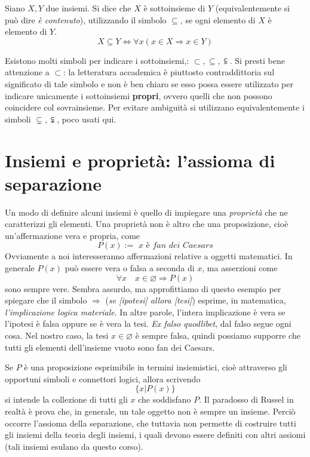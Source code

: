 \documentclass[oneside]{book}
\begin{document}
\begin{tcolorbox}[colback=yellow!30, colframe=yellow!30!black, title={Sottoinsiemi}]
Siano $X,Y$ due insiemi. Si dice che $X$ è sottoinsieme di $Y$
(equivalentemente si può dire \emph{è contenuto}), utilizzando il simbolo $\subseteq$,
se ogni elemento di $X$ è elemento di $Y$.
\[ X \subseteq Y \Longleftrightarrow \forall x(x\in X \Rightarrow x\in Y) \]
\end{tcolorbox}

\begin{osservaz}
Esistono molti simboli per indicare i
sottoinsiemi,: $\subset,\subseteq,\subseteqq$.
Si presti bene attenzione a $\subset$: la letteratura
accademica è piuttosto contraddittoria sul significato di tale
simbolo e non è ben chiaro se esso possa essere utilizzato per
indicare unicamente i sottoinsiemi \textbf{propri}, ovvero quelli
che non possono coincidere col sovrainsieme. Per evitare
ambiguità si utilizzano equivalentemente i simboli $\subsetneq,\subsetneqq$, poco usati
qui.
\end{osservaz}

\section{Insiemi e proprietà: l'assioma di separazione}
Un modo di definire alcuni insiemi è quello di impiegare una \textit{proprietà}
che ne caratterizzi gli elementi. Una proprietà non è altro che una proposizione,
cioè un'affermazione vera e propria, come
\[ P(x) := \textit{ x è fan dei Caesars} \]
Ovviamente a noi interesseranno affermazioni relative a oggetti matematici.
In generale $P(x)$ può essere vera o falsa a seconda di $x$, ma asserzioni come
\[ \forall x \quad x\in\varnothing\Longrightarrow P(x) \]
sono sempre vere. Sembra assurdo, ma approfittiamo di questo esempio per
spiegare che il simbolo $\Longrightarrow$ (\textit{se [ipotesi] allora [tesi]}) esprime, in matematica, \textit{l'implicazione logica materiale}.
In altre parole, l'intera implicazione è vera se l'ipotesi è falsa oppure se
è vera la tesi. \textit{Ex falso quodlibet}, dal falso segue ogni cosa. Nel
nostro caso, la tesi $x\in\varnothing$ è sempre falsa, quindi possiamo
supporre che tutti gli elementi dell'insieme vuoto sono fan dei Caesars.


Se $P$ è una proposizione esprimibile
in termini insiemistici, cioè attraverso gli opportuni simboli e connettori
logici, allora scrivendo
\[\{x|P(x)\}\]
si intende la collezione di tutti gli $x$ che soddisfano $P$. Il paradosso
di Russel in realtà è prova che, in generale, un tale oggetto non è
sempre un insieme. Perciò occorre l'assioma della separazione, che tuttavia
non permette di costruire tutti gli insiemi della teoria degli insiemi, i
quali devono essere definiti con altri assiomi
(tali insiemi esulano da questo corso).
\end{document}
